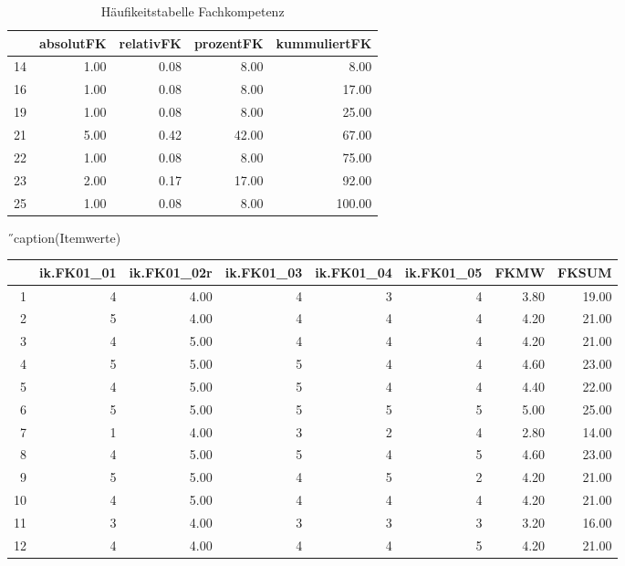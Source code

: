 \begin{table}[ht]
\centering
\caption{Häufikeitstabelle Fachkompetenz}
\begin{tabular}{rrrrr}
  \hline
 & absolutFK & relativFK & prozentFK & kummuliertFK \\
  \hline
14 & 1.00 & 0.08 & 8.00 & 8.00 \\
  16 & 1.00 & 0.08 & 8.00 & 17.00 \\
  19 & 1.00 & 0.08 & 8.00 & 25.00 \\
  21 & 5.00 & 0.42 & 42.00 & 67.00 \\
  22 & 1.00 & 0.08 & 8.00 & 75.00 \\
  23 & 2.00 & 0.17 & 17.00 & 92.00 \\
  25 & 1.00 & 0.08 & 8.00 & 100.00 \\
   \hline
\end{tabular}
\end{table}


\begin{table}[ht]
  ˝caption(Itemwerte)
\centering
\begin{tabular}{rrrrrrrr}
  \hline
 & ik.FK01\_01 & ik.FK01\_02r & ik.FK01\_03 & ik.FK01\_04 & ik.FK01\_05 & FKMW & FKSUM \\
  \hline
1 &   4 & 4.00 &   4 &   3 &   4 & 3.80 & 19.00 \\
  2 &   5 & 4.00 &   4 &   4 &   4 & 4.20 & 21.00 \\
  3 &   4 & 5.00 &   4 &   4 &   4 & 4.20 & 21.00 \\
  4 &   5 & 5.00 &   5 &   4 &   4 & 4.60 & 23.00 \\
  5 &   4 & 5.00 &   5 &   4 &   4 & 4.40 & 22.00 \\
  6 &   5 & 5.00 &   5 &   5 &   5 & 5.00 & 25.00 \\
  7 &   1 & 4.00 &   3 &   2 &   4 & 2.80 & 14.00 \\
  8 &   4 & 5.00 &   5 &   4 &   5 & 4.60 & 23.00 \\
  9 &   5 & 5.00 &   4 &   5 &   2 & 4.20 & 21.00 \\
  10 &   4 & 5.00 &   4 &   4 &   4 & 4.20 & 21.00 \\
  11 &   3 & 4.00 &   3 &   3 &   3 & 3.20 & 16.00 \\
  12 &   4 & 4.00 &   4 &   4 &   5 & 4.20 & 21.00 \\
   \hline
\end{tabular}
\end{table}

